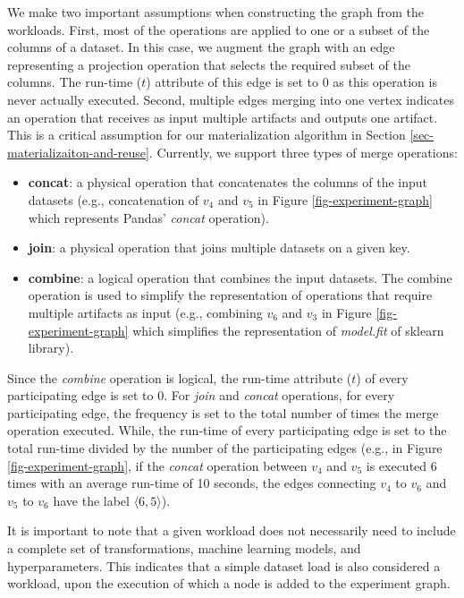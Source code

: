 We make two important assumptions when constructing the graph from the workloads.
First, most of the operations are applied to one or a subset of the columns of a dataset.
In this case, we augment the graph with an edge representing a projection operation that selects the required subset of the columns.
The run-time ($t$) attribute of this edge is set to 0 as this operation is never actually executed.
Second, multiple edges merging into one vertex indicates an operation that receives as input multiple artifacts and outputs one artifact.
This is a critical assumption for our materialization algorithm in Section \ref{sec-materializaiton-and-reuse}.
Currently, we support three types of merge operations:
\begin{itemize}
\item \textbf{concat}: a physical operation that concatenates the columns of the input datasets (e.g., concatenation of $v_4$ and $v_5$ in Figure \ref{fig-experiment-graph} which represents Pandas' \textit{concat} operation).
\item \textbf{join}: a physical operation that joins multiple datasets on a given key.
\item \textbf{combine}: a logical operation that combines the input datasets. The combine operation is used to simplify the representation of operations that require multiple artifacts as input (e.g., combining $v_6$ and $v_3$ in Figure \ref{fig-experiment-graph} which simplifies the representation of \textit{model.fit} of sklearn library).
\end{itemize}
Since the \textit{combine} operation is logical, the run-time attribute ($t$) of every participating edge is set to $0$.
For \textit{join} and \textit{concat} operations, for every participating edge, the frequency is set to the total number of times the merge operation executed.
While, the run-time of every participating edge is set to the total run-time divided by the number of the participating edges (e.g., in Figure \ref{fig-experiment-graph}, if the \textit{concat} operation between $v_4$ and $v_5$ is executed 6 times with an average run-time of 10 seconds, the edges connecting $v_4$ to $v_6$ and $v_5$ to $v_6$ have the label $\langle6, 5\rangle$).

It is important to note that a given workload does not necessarily need to include a complete set of transformations, machine learning models, and hyperparameters.
This indicates that a simple dataset load is also considered a workload, upon the execution of which a node is added to the experiment graph.